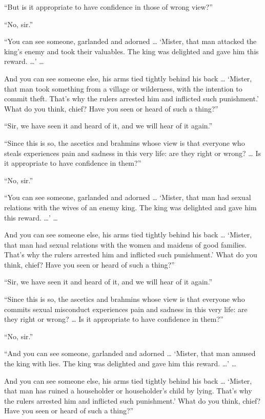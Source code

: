 \documentclass[12pt,openany]{book}%
\begin{document}
“But is it appropriate to have confidence in those of wrong view?” 

“No, sir.” 

“You can see someone, garlanded and adorned … ‘Mister, that man attacked the king’s enemy and took their valuables. The king was delighted and gave him this reward. …’ … 

And you can see someone else, his arms tied tightly behind his back … ‘Mister, that man took something from a village or wilderness, with the intention to commit theft. That’s why the rulers arrested him and inflicted such punishment.’ What do you think, chief? Have you seen or heard of such a thing?” 

“Sir, we have seen it and heard of it, and we will hear of it again.” 

“Since this is so, the ascetics and brahmins whose view is that everyone who steals experiences pain and sadness in this very life: are they right or wrong? … Is it appropriate to have confidence in them?” 

“No, sir.” 

“You can see someone, garlanded and adorned … ‘Mister, that man had sexual relations with the wives of an enemy king. The king was delighted and gave him this reward. …’ … 

And you can see someone else, his arms tied tightly behind his back … ‘Mister, that man had sexual relations with the women and maidens of good families. That’s why the rulers arrested him and inflicted such punishment.’ What do you think, chief? Have you seen or heard of such a thing?” 

“Sir, we have seen it and heard of it, and we will hear of it again.” 

“Since this is so, the ascetics and brahmins whose view is that everyone who commits sexual misconduct experiences pain and sadness in this very life: are they right or wrong? … Is it appropriate to have confidence in them?” 

“No, sir.” 

“And you can see someone, garlanded and adorned … ‘Mister, that man amused the king with lies. The king was delighted and gave him this reward. …’ … 

And you can see someone else, his arms tied tightly behind his back … ‘Mister, that man has ruined a householder or householder’s child by lying. That’s why the rulers arrested him and inflicted such punishment.’ What do you think, chief? Have you seen or heard of such a thing?” 
\end{document}
